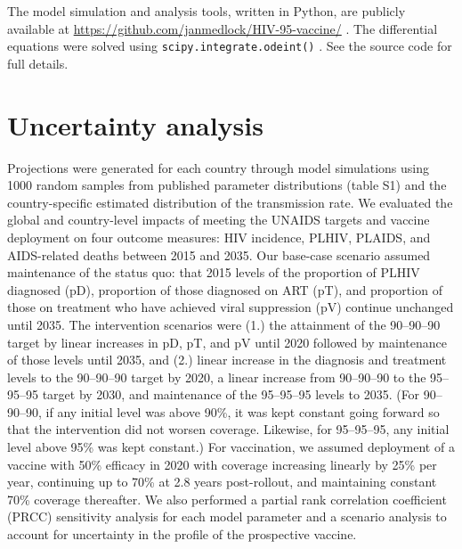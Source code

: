 \documentclass{article}
\begin{document}
The model simulation and analysis tools, written in Python, are
publicly available at
\url{https://github.com/janmedlock/HIV-95-vaccine/}
\cite{medlock2016-git}.  The differential equations were solved using
\texttt{scipy.integrate.odeint()} \cite{scipy}.  See the source code
for full details.


\section{Uncertainty analysis}
\label{uncertainty}

Projections were generated for each country through model simulations
using 1000 random samples from published parameter distributions
(table S1) and the country-specific estimated distribution of the
transmission rate. We evaluated the global and country-level impacts
of meeting the UNAIDS targets and vaccine deployment on four outcome
measures: HIV incidence, PLHIV, PLAIDS, and AIDS-related deaths
between 2015 and 2035. Our base-case scenario assumed maintenance of
the status quo: that 2015 levels of the proportion of PLHIV diagnosed
(pD), proportion of those diagnosed on ART (pT), and proportion of
those on treatment who have achieved viral suppression (pV) continue
unchanged until 2035. The intervention scenarios were (1.) the
attainment of the 90–90–90 target by linear increases in pD, pT, and
pV until 2020 followed by maintenance of those levels until 2035, and
(2.) linear increase in the diagnosis and treatment levels to the
90–90–90 target by 2020, a linear increase from 90–90–90 to the
95–95–95 target by 2030, and maintenance of the 95–95–95 levels to
2035. (For 90–90–90, if any initial level was above 90\%, it was kept
constant going forward so that the intervention did not worsen
coverage.  Likewise, for 95–95–95, any initial level above 95\% was
kept constant.)  For vaccination, we assumed deployment of a vaccine
with 50\% efficacy in 2020 with coverage increasing linearly by 25\%
per year, continuing up to 70\% at 2.8 years post-rollout, and
maintaining constant 70\% coverage thereafter.  We also performed a
partial rank correlation coefficient (PRCC) sensitivity analysis for
each model parameter and a scenario analysis to account for
uncertainty in the profile of the prospective vaccine.
\end{document}
